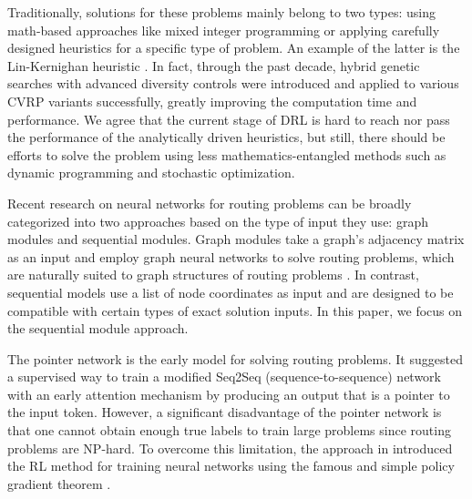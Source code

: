 \documentclass{article}
\begin{document}
Traditionally, solutions for these problems mainly belong to two types: using math-based approaches like mixed integer programming or applying carefully designed heuristics for a specific type of problem. An example of the latter is the Lin-Kernighan heuristic \cite{linEffectiveHeuristicAlgorithm1973}. In fact, through the past decade, hybrid genetic searches with advanced diversity controls were introduced and applied to various CVRP variants successfully, greatly improving the computation time and performance\cite{HGS, hybridGeneticSearch_Vidal}. We agree that the current stage of DRL is hard to reach nor pass the performance of the analytically driven heuristics, but still, there should be efforts to solve the problem using less mathematics-entangled methods such as dynamic programming and stochastic optimization.


Recent research on neural networks for routing problems can be broadly categorized into two approaches based on the type of input they use: graph modules and sequential modules. Graph modules take a graph's adjacency matrix as an input and employ graph neural networks to solve routing problems, which are naturally suited to graph structures of routing problems \cite{daiLearningCombinatorialOptimization2018, kwonMatNet}. In contrast, sequential models use a list of node coordinates as input and are designed to be compatible with certain types of exact solution inputs. In this paper, we focus on the sequential module approach.

The pointer network \cite{vinyalsPointerNetworks2017} is the early model for solving routing problems. It suggested a supervised way to train a modified Seq2Seq (sequence-to-sequence) network \cite{sutskeverSequenceSequenceLearning2014} with an early attention mechanism \cite{luongEffectiveApproachesAttentionbased2015} by producing an output that is a pointer to the input token. However, a significant disadvantage of the pointer network is that one cannot obtain enough true labels to train large problems since routing problems are NP-hard. To overcome this limitation, the approach in \cite{belloNeuralCombinatorialOptimization2017} introduced the RL method for training neural networks using the famous and simple policy gradient theorem \cite{suttonPolicyGradientMethods}.
\end{document}
